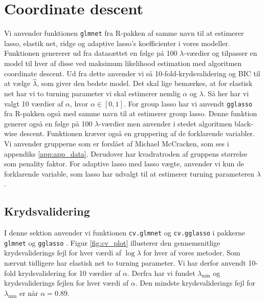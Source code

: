 \section{Coordinate descent}
Vi anvender funktionen \texttt{glmnet} fra R-pakken af samme navn til at estimerer lasso, elastik net, ridge og adaptive lasso's koefficienter i vores modeller. Funktionen genererer ud fra datasættet en følge på 100 $\lambda$-værdier og tilpasser en model til hver af disse ved maksimum likelihood estimation med algoritmen coordinate descent. 
Ud fra dette anvender vi så 10-fold-krydsvalidering og BIC til at vælge $\widehat{\lambda}$, som giver den bedste model. 
Det skal lige bemærkes, at for elastisk net har vi to turning parameter vi skal estimerer nemlig $\alpha$ og $\lambda$.  Så her har vi valgt 10 værdier af  $\alpha$, hvor $\alpha \in [0,1]$. 
For group lasso har vi anvendt \texttt{gglasso} fra R-pakken også med samme navn til at estimerer group lasso. Denne funktion generer også en følge på 100 $\lambda$-værdier men anvender i stedet algoritmen black-wise descent.  Funktionen kræver også en gruppering af de forklarende variabler. 
Vi anvender grupperne som er forslået af Michael McCracken, som ses i appendiks \ref{app:app_data}. Derudover har kvadratroden af gruppens størrelse som penality faktor. 
For adaptive lasso med lasso vægte, anvender vi kun de forklarende variable, som lasso har udvalgt til at estimerer turning parameteren $\lambda$. 

\subsection{Krydsvalidering}
I denne sektion anvender vi funktionen \texttt{cv.glmnet} og \texttt{cv.gglasso} i pakkerne \texttt{glmnet} og \texttt{gglasso} . 
Figur \ref{fig:cv_plot} illusterer den gennemsnitlige krydsvaliderings fejl for hver værdi af $\log \lambda$ for hver af vores metoder.
Som nærvnt tidligere har elastisk net to turning parameter. Vi har derfor anvendt 10-fold krydsvalidering for 10 værdier af $\alpha$. Derfra har vi fundet  $\lambda_{\min}$ og krydsvaliderings fejlen for hver værdi af $\alpha$.  
Den mindste krydsvaliderings fejl for $\lambda_{\min}$ er når $\alpha =0.89$. 




